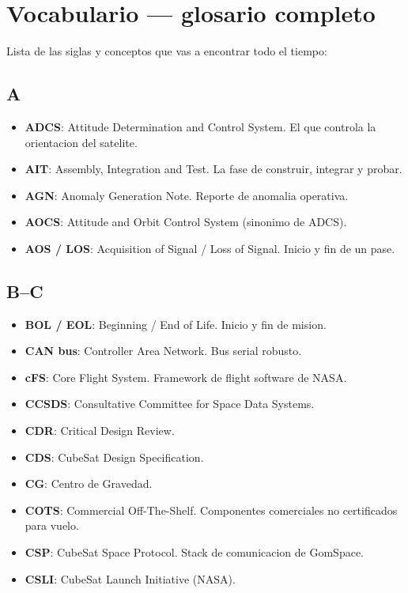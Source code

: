\documentclass[11pt,a4paper,oneside,openright]{book}
\begin{document}
\chapter{Vocabulario --- glosario completo}
\label{ch:glosario}

Lista de las siglas y conceptos que vas a encontrar todo el tiempo:

\section*{A}

\begin{itemize}[leftmargin=2em]
  \item \textbf{ADCS}: Attitude Determination and Control System. El que
        controla la orientacion del satelite.
  \item \textbf{AIT}: Assembly, Integration and Test. La fase de
        construir, integrar y probar.
  \item \textbf{AGN}: Anomaly Generation Note. Reporte de anomalia operativa.
  \item \textbf{AOCS}: Attitude and Orbit Control System (sinonimo de ADCS).
  \item \textbf{AOS / LOS}: Acquisition of Signal / Loss of Signal. Inicio
        y fin de un pase.
\end{itemize}

\section*{B--C}

\begin{itemize}[leftmargin=2em]
  \item \textbf{BOL / EOL}: Beginning / End of Life. Inicio y fin de
        mision.
  \item \textbf{CAN bus}: Controller Area Network. Bus serial robusto.
  \item \textbf{cFS}: Core Flight System. Framework de flight software de NASA.
  \item \textbf{CCSDS}: Consultative Committee for Space Data Systems.
  \item \textbf{CDR}: Critical Design Review.
  \item \textbf{CDS}: CubeSat Design Specification.
  \item \textbf{CG}: Centro de Gravedad.
  \item \textbf{COTS}: Commercial Off-The-Shelf. Componentes comerciales no
        certificados para vuelo.
  \item \textbf{CSP}: CubeSat Space Protocol. Stack de comunicacion de
        GomSpace.
  \item \textbf{CSLI}: CubeSat Launch Initiative (NASA).
\end{itemize}
\end{document}
